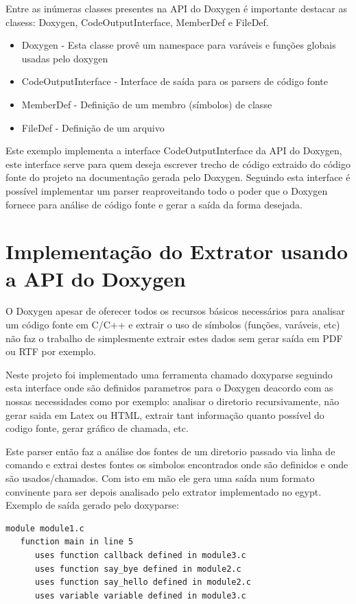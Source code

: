 Entre as inúmeras classes presentes na API do Doxygen é importante destacar as clasess: Doxygen, CodeOutputInterface, MemberDef e FileDef.

\begin{itemize}
\item Doxygen - Esta classe provê um namespace para varáveis e funções globais usadas pelo doxygen
\item CodeOutputInterface - Interface de saída para os parsers de código fonte
\item MemberDef - Definição de um membro (símbolos) de classe
\item FileDef - Definição de um arquivo
\end{itemize}

Este exemplo implementa a interface CodeOutputInterface da API do Doxygen, este interface serve para quem deseja escrever trecho de código extraido do código fonte do projeto na documentação gerada pelo Doxygen. Seguindo esta interface é possível implementar um parser reaproveitando todo o poder que o Doxygen fornece para análise de código fonte e gerar a saída da forma desejada.



\section{Implementação do Extrator usando a API do Doxygen}

O Doxygen apesar de oferecer todos os recursos básicos necessários para analisar um código fonte em C/C++ e extrair o uso de símbolos (funções, varáveis, etc) não faz o trabalho de simplesmente extrair estes dados sem gerar saída em PDF ou RTF por exemplo.


Neste projeto foi implementado uma ferramenta chamado doxyparse seguindo esta interface onde são definidos parametros para o Doxygen deacordo com as nossas necessidades como por exemplo: analisar o diretorio recursivamente, não gerar saida em Latex ou HTML, extrair tant informação quanto possível do codigo fonte, gerar gráfico de chamada, etc.

Este parser então faz a análise dos fontes de um diretorio passado via linha de comando e extrai destes fontes os simbolos encontrados onde são definidos e onde são usados/chamados. Com isto em mão ele gera uma saída num formato convinente para ser depois analisado pelo extrator implementado no egypt. Exemplo de saída gerado pelo doxyparse:

\begin{verbatim}
module module1.c
   function main in line 5
      uses function callback defined in module3.c
      uses function say_bye defined in module2.c
      uses function say_hello defined in module2.c
      uses variable variable defined in module3.c
\end{verbatim}

